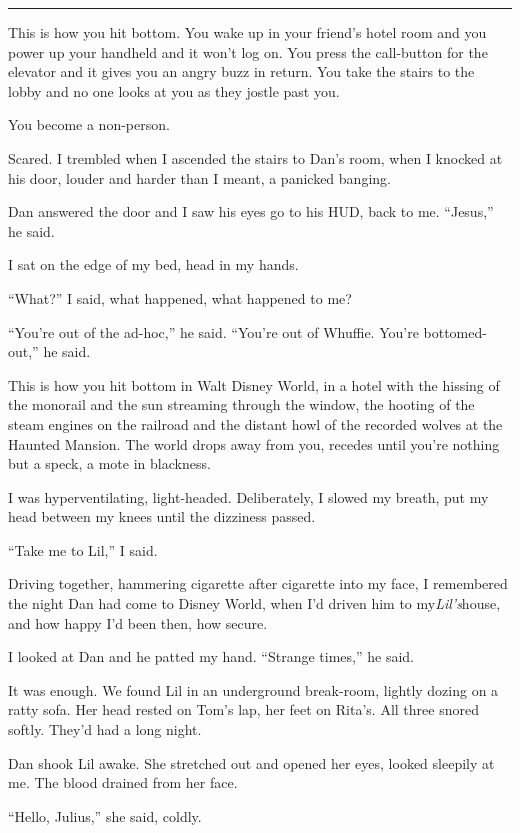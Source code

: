 \begin{center}\rule{3in}{0.4pt}\end{center}

This is how you hit bottom. You wake up in your friend's hotel room
and you power up your handheld and it won't log on. You press the
call-button for the elevator and it gives you an angry buzz in
return. You take the stairs to the lobby and no one looks at you as
they jostle past you.

You become a non-person.

Scared. I trembled when I ascended the stairs to Dan's room, when I
knocked at his door, louder and harder than I meant, a panicked
banging.

Dan answered the door and I saw his eyes go to his HUD, back to me.
“Jesus,” he said.

I sat on the edge of my bed, head in my hands.

“What?” I said, what happened, what happened to me?

“You're out of the ad-hoc,” he said. “You're out of Whuffie. You're
bottomed-out,” he said.

This is how you hit bottom in Walt Disney World, in a hotel with
the hissing of the monorail and the sun streaming through the
window, the hooting of the steam engines on the railroad and the
distant howl of the recorded wolves at the Haunted Mansion. The
world drops away from you, recedes until you're nothing but a
speck, a mote in blackness.

I was hyperventilating, light-headed. Deliberately, I slowed my
breath, put my head between my knees until the dizziness passed.

“Take me to Lil,” I said.

Driving together, hammering cigarette after cigarette into my face,
I remembered the night Dan had come to Disney World, when I'd
driven him to my{\dash}\emph{Lil's}{\dash}house, and how happy I'd been then,
how secure.

I looked at Dan and he patted my hand. “Strange times,” he said.

It was enough. We found Lil in an underground break-room, lightly
dozing on a ratty sofa. Her head rested on Tom's lap, her feet on
Rita's. All three snored softly. They'd had a long night.

Dan shook Lil awake. She stretched out and opened her eyes, looked
sleepily at me. The blood drained from her face.

“Hello, Julius,” she said, coldly.

